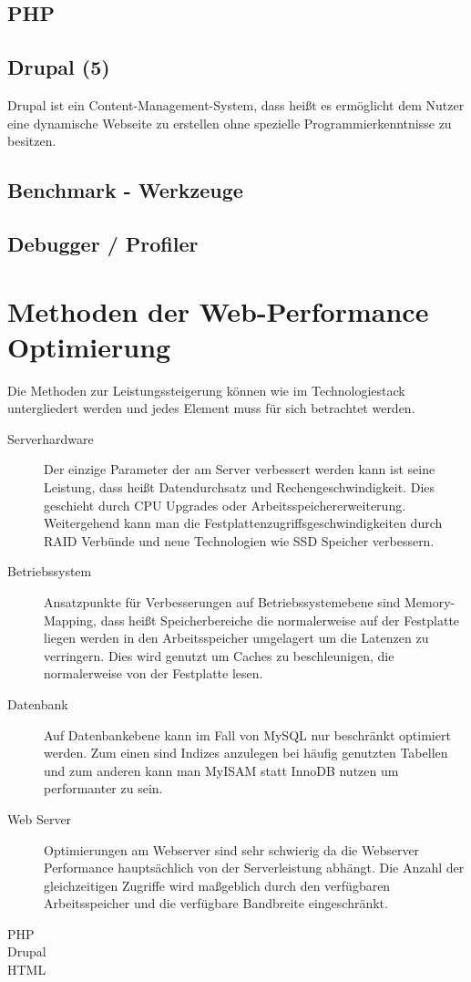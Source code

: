 \subsection{PHP}
\subsection{Drupal (5)}
Drupal ist ein Content-Management-System, dass heißt es ermöglicht dem Nutzer eine dynamische Webseite zu erstellen ohne spezielle Programmierkenntnisse zu besitzen. 

\subsection{Benchmark - Werkzeuge}
\subsection{Debugger / Profiler}
\section{Methoden der Web-Performance Optimierung}
Die Methoden zur Leistungssteigerung können wie im Technologiestack untergliedert werden und jedes Element muss für sich betrachtet werden.

\begin{description}
  \item[Serverhardware] Der einzige Parameter der am Server verbessert werden kann ist seine Leistung, dass heißt Datendurchsatz und Rechengeschwindigkeit. Dies geschieht durch CPU Upgrades oder Arbeitsspeichererweiterung. Weitergehend kann man die Festplattenzugriffsgeschwindigkeiten durch RAID Verbünde und neue Technologien wie SSD Speicher verbessern. 
  \item[Betriebssystem] Ansatzpunkte für Verbesserungen auf Betriebssystemebene sind Memory-Mapping, dass heißt Speicherbereiche die normalerweise auf der Festplatte liegen werden in den Arbeitsspeicher umgelagert um die Latenzen zu verringern. Dies wird genutzt um Caches zu beschleunigen, die normalerweise von der Festplatte lesen.
  \item[Datenbank] Auf Datenbankebene kann im Fall von MySQL nur beschränkt optimiert werden. Zum einen sind Indizes anzulegen bei häufig genutzten Tabellen und zum anderen kann man MyISAM statt InnoDB nutzen um performanter zu sein.
  \item[Web Server] Optimierungen am Webserver sind sehr schwierig da die Webserver Performance hauptsächlich von der Serverleistung abhängt. Die Anzahl der gleichzeitigen Zugriffe wird maßgeblich durch den verfügbaren Arbeitsspeicher und die verfügbare Bandbreite eingeschränkt.
  \item[PHP] 
  \item[Drupal] 
  \item[HTML] 
\end{description}


%
%
